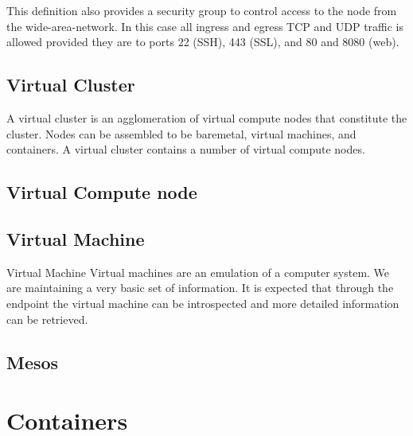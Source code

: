 \documentclass[9pt,twocolumn,twoside]{styles/osajnl}
\begin{document}
This definition also provides a security group to control access to
the node from the wide-area-network. In this case all ingress and
egress TCP and UDP traffic is allowed provided they are to ports 22
(SSH), 443 (SSL), and 80 and 8080 (web).





\subsection{Virtual Cluster}

A virtual cluster is an agglomeration of virtual compute nodes that
constitute the cluster. Nodes can be assembled to be baremetal,
virtual machines, and containers. A virtual cluster contains a number
of virtual compute nodes.  
 

\subsection{Virtual Compute node}


\subsection{Virtual Machine}

Virtual Machine 
Virtual machines are an emulation of a computer system. We are maintaining a very basic set of information. It is expected that through the endpoint the virtual machine can be introspected and more detailed information can be retrieved. 


\subsection{Mesos}



\section{Containers}
\end{document}
